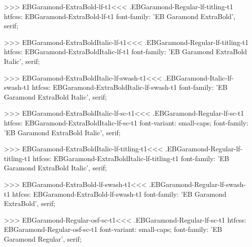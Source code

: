{{{{{{{>>>
\<EBGaramond-ExtraBold-lf-t1\><<<
.EBGaramond-Regular-lf-titling-t1
htfcss:  EBGaramond-ExtraBold-lf-t1  font-family: 'EB Garamond ExtraBold', serif;

>>>
\<EBGaramond-ExtraBoldItalic-lf-t1\><<<
.EBGaramond-Regular-lf-titling-t1
htfcss:  EBGaramond-ExtraBoldItalic-lf-t1  font-family: 'EB Garamond ExtraBold Italic', serif;

>>>
\<EBGaramond-ExtraBoldItalic-lf-swash-t1\><<<
.EBGaramond-Italic-lf-swash-t1
htfcss:  EBGaramond-ExtraBoldItalic-lf-swash-t1  font-family: 'EB Garamond ExtraBold Italic', serif;

>>>
\<EBGaramond-ExtraBoldItalic-lf-sc-t1\><<<
.EBGaramond-Regular-lf-sc-t1
htfcss:  EBGaramond-ExtraBoldItalic-lf-sc-t1  font-variant: small-caps; font-family: 'EB Garamond ExtraBold Italic', serif;

>>>
\<EBGaramond-ExtraBoldItalic-lf-titling-t1\><<<
.EBGaramond-Regular-lf-titling-t1
htfcss:  EBGaramond-ExtraBoldItalic-lf-titling-t1  font-family: 'EB Garamond ExtraBold Italic', serif;

>>>
\<EBGaramond-ExtraBold-lf-swash-t1\><<<
.EBGaramond-Regular-lf-swash-t1
htfcss:  EBGaramond-ExtraBold-lf-swash-t1  font-family: 'EB Garamond ExtraBold', serif;

>>>
\<EBGaramond-Regular-osf-sc-t1\><<<
.EBGaramond-Regular-lf-sc-t1
htfcss:  EBGaramond-Regular-osf-sc-t1  font-variant: small-caps; font-family: 'EB Garamond Regular', serif;

}}}}}}}
